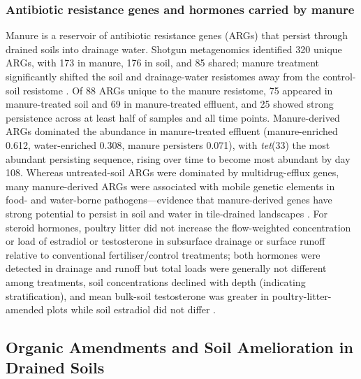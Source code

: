 \documentclass[11pt]{article}
\begin{document}
\subsubsection{Antibiotic resistance genes and hormones carried by manure}
Manure is a reservoir of antibiotic resistance genes (ARGs) that persist through drained soils into drainage water. Shotgun metagenomics identified 320 unique ARGs, with 173 in manure, 176 in soil, and 85 shared; manure treatment significantly shifted the soil and drainage-water resistomes away from the control-soil resistome \parencite{Smith2019b}. Of 88 ARGs unique to the manure resistome, 75 appeared in manure-treated soil and 69 in manure-treated effluent, and 25 showed strong persistence across at least half of samples and all time points. Manure-derived ARGs dominated the abundance in manure-treated effluent (manure-enriched 0.612, water-enriched 0.308, manure persisters 0.071), with \textit{tet}(33) the most abundant persisting sequence, rising over time to become most abundant by day 108. Whereas untreated-soil ARGs were dominated by multidrug-efflux genes, many manure-derived ARGs were associated with mobile genetic elements in food- and water-borne pathogens---evidence that manure-derived genes have strong potential to persist in soil and water in tile-drained landscapes \parencite{Smith2019b}. For steroid hormones, poultry litter did not increase the flow-weighted concentration or load of estradiol or testosterone in subsurface drainage or surface runoff relative to conventional fertiliser/control treatments; both hormones were detected in drainage and runoff but total loads were generally not different among treatments, soil concentrations declined with depth (indicating stratification), and mean bulk-soil testosterone was greater in poultry-litter-amended plots while soil estradiol did not differ \parencite{Jenkins2009}.

\subsection{Organic Amendments and Soil Amelioration in Drained Soils}
\end{document}
